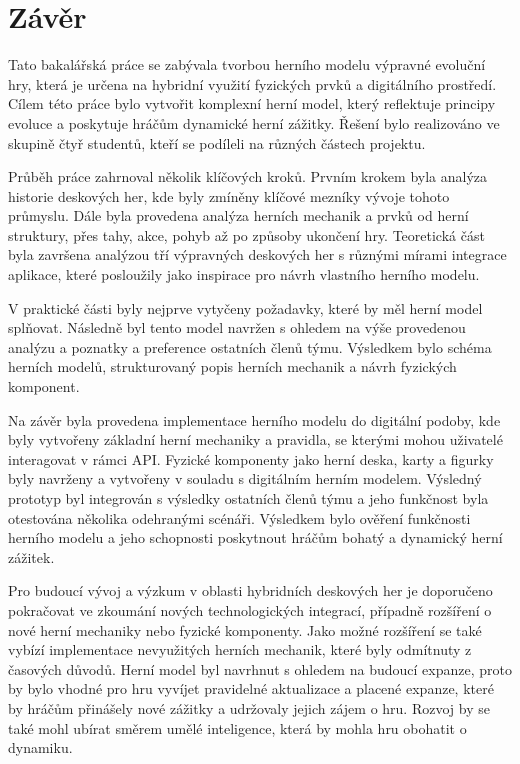 \chapter{Závěr}

Tato bakalářská práce se zabývala tvorbou herního modelu výpravné evoluční hry, která je určena na hybridní využití fyzických prvků a digitálního prostředí. Cílem této práce bylo vytvořit komplexní herní model, který reflektuje principy evoluce a poskytuje hráčům dynamické herní zážitky. Řešení bylo realizováno ve skupině čtyř studentů, kteří se podíleli na různých částech projektu.

Průběh práce zahrnoval několik klíčových kroků. Prvním krokem byla analýza historie deskových her, kde byly zmíněny klíčové mezníky vývoje tohoto průmyslu. Dále byla provedena analýza herních mechanik a prvků od herní struktury, přes tahy, akce, pohyb až po způsoby ukončení hry. Teoretická část byla završena analýzou tří výpravných deskových her s různými mírami integrace aplikace, které posloužily jako inspirace pro návrh vlastního herního modelu.

V praktické části byly nejprve vytyčeny požadavky, které by měl herní model splňovat. Následně byl tento model navržen s ohledem na výše provedenou analýzu a poznatky a preference ostatních členů týmu. Výsledkem bylo schéma herních modelů, strukturovaný popis herních mechanik a návrh fyzických komponent.

Na závěr byla provedena implementace herního modelu do digitální podoby, kde byly vytvořeny základní herní mechaniky a pravidla, se kterými mohou uživatelé interagovat v rámci API. Fyzické komponenty jako herní deska, karty a figurky byly navrženy a vytvořeny v souladu s digitálním herním modelem. Výsledný prototyp byl integrován s výsledky ostatních členů týmu a jeho funkčnost byla otestována několika odehranými scénáři. Výsledkem bylo ověření funkčnosti herního modelu a jeho schopnosti poskytnout hráčům bohatý a dynamický herní zážitek.

Pro budoucí vývoj a výzkum v oblasti hybridních deskových her je doporučeno pokračovat ve zkoumání nových technologických integrací, případně rozšíření o nové herní mechaniky nebo fyzické komponenty. Jako možné rozšíření se také vybízí implementace nevyužitých herních mechanik, které byly odmítnuty z časových důvodů. Herní model byl navrhnut s ohledem na budoucí expanze, proto by bylo vhodné pro hru vyvíjet pravidelné aktualizace a placené expanze, které by hráčům přinášely nové zážitky a udržovaly jejich zájem o hru. Rozvoj by se také mohl ubírat směrem umělé inteligence, která by mohla hru obohatit o dynamiku.

